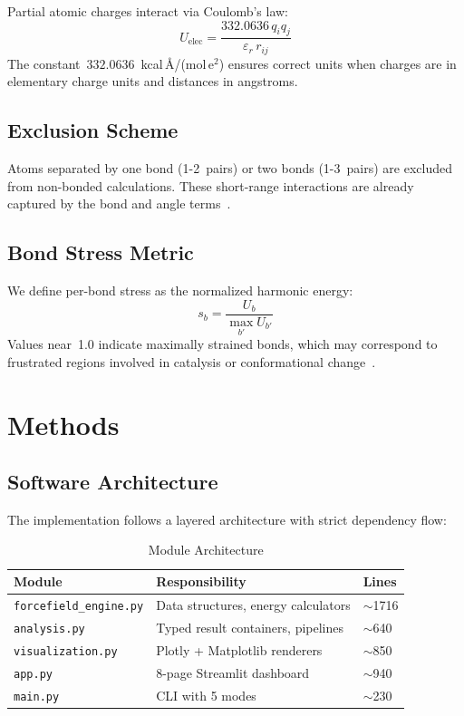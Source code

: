\documentclass[conference]{IEEEtran}
\begin{document}
Partial atomic charges interact via Coulomb's law:
\begin{equation}\label{eq:coulomb}
U_{\text{elec}} = \frac{332.0636 \, q_i q_j}{\varepsilon_r \, r_{ij}}
\end{equation}
The constant~$332.0636$~kcal\,\AA/(mol\,e$^2$) ensures correct units when
charges are in elementary charge units and distances in angstroms.

\subsection{Exclusion Scheme}

Atoms separated by one bond (1-2~pairs) or two bonds (1-3~pairs) are excluded
from non-bonded calculations.  These short-range interactions are already
captured by the bond and angle terms~\cite{cornell1995}.

\subsection{Bond Stress Metric}

We define per-bond stress as the normalized harmonic energy:
\begin{equation}\label{eq:stress}
s_b = \frac{U_b}{\max_{b'} U_{b'}}
\end{equation}
Values near~1.0 indicate maximally strained bonds, which may correspond to
frustrated regions involved in catalysis or conformational
change~\cite{brooks2009}.

\section{Methods}

\subsection{Software Architecture}

The implementation follows a layered architecture with strict dependency flow:

\begin{table}[H]
\centering
\caption{Module Architecture}
\label{tab:architecture}
\begin{tabular}{@{}lll@{}}
\toprule
Module & Responsibility & Lines \\
\midrule
\texttt{forcefield\_engine.py} & Data structures, energy calculators & $\sim$1716 \\
\texttt{analysis.py} & Typed result containers, pipelines & $\sim$640 \\
\texttt{visualization.py} & Plotly + Matplotlib renderers & $\sim$850 \\
\texttt{app.py} & 8-page Streamlit dashboard & $\sim$940 \\
\texttt{main.py} & CLI with 5 modes & $\sim$230 \\
\bottomrule
\end{tabular}
\end{table}
\end{document}
